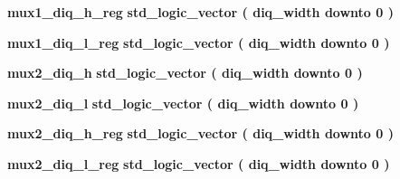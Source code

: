 \begin{DoxyCompactItemize}
\item 
{\bf mux1\+\_\+diq\+\_\+h\+\_\+reg} {\bfseries \textcolor{comment}{std\+\_\+logic\+\_\+vector}\textcolor{vhdlchar}{ }\textcolor{vhdlchar}{(}\textcolor{vhdlchar}{ }\textcolor{vhdlchar}{ }\textcolor{vhdlchar}{ }\textcolor{vhdlchar}{ }{\bfseries {\bf diq\+\_\+width}} \textcolor{vhdlchar}{ }\textcolor{keywordflow}{downto}\textcolor{vhdlchar}{ }\textcolor{vhdlchar}{ } \textcolor{vhdldigit}{0} \textcolor{vhdlchar}{ }\textcolor{vhdlchar}{)}\textcolor{vhdlchar}{ }} 
\item 
{\bf mux1\+\_\+diq\+\_\+l\+\_\+reg} {\bfseries \textcolor{comment}{std\+\_\+logic\+\_\+vector}\textcolor{vhdlchar}{ }\textcolor{vhdlchar}{(}\textcolor{vhdlchar}{ }\textcolor{vhdlchar}{ }\textcolor{vhdlchar}{ }\textcolor{vhdlchar}{ }{\bfseries {\bf diq\+\_\+width}} \textcolor{vhdlchar}{ }\textcolor{keywordflow}{downto}\textcolor{vhdlchar}{ }\textcolor{vhdlchar}{ } \textcolor{vhdldigit}{0} \textcolor{vhdlchar}{ }\textcolor{vhdlchar}{)}\textcolor{vhdlchar}{ }} 
\item 
{\bf mux2\+\_\+diq\+\_\+h} {\bfseries \textcolor{comment}{std\+\_\+logic\+\_\+vector}\textcolor{vhdlchar}{ }\textcolor{vhdlchar}{(}\textcolor{vhdlchar}{ }\textcolor{vhdlchar}{ }\textcolor{vhdlchar}{ }\textcolor{vhdlchar}{ }{\bfseries {\bf diq\+\_\+width}} \textcolor{vhdlchar}{ }\textcolor{keywordflow}{downto}\textcolor{vhdlchar}{ }\textcolor{vhdlchar}{ } \textcolor{vhdldigit}{0} \textcolor{vhdlchar}{ }\textcolor{vhdlchar}{)}\textcolor{vhdlchar}{ }} 
\item 
{\bf mux2\+\_\+diq\+\_\+l} {\bfseries \textcolor{comment}{std\+\_\+logic\+\_\+vector}\textcolor{vhdlchar}{ }\textcolor{vhdlchar}{(}\textcolor{vhdlchar}{ }\textcolor{vhdlchar}{ }\textcolor{vhdlchar}{ }\textcolor{vhdlchar}{ }{\bfseries {\bf diq\+\_\+width}} \textcolor{vhdlchar}{ }\textcolor{keywordflow}{downto}\textcolor{vhdlchar}{ }\textcolor{vhdlchar}{ } \textcolor{vhdldigit}{0} \textcolor{vhdlchar}{ }\textcolor{vhdlchar}{)}\textcolor{vhdlchar}{ }} 
\item 
{\bf mux2\+\_\+diq\+\_\+h\+\_\+reg} {\bfseries \textcolor{comment}{std\+\_\+logic\+\_\+vector}\textcolor{vhdlchar}{ }\textcolor{vhdlchar}{(}\textcolor{vhdlchar}{ }\textcolor{vhdlchar}{ }\textcolor{vhdlchar}{ }\textcolor{vhdlchar}{ }{\bfseries {\bf diq\+\_\+width}} \textcolor{vhdlchar}{ }\textcolor{keywordflow}{downto}\textcolor{vhdlchar}{ }\textcolor{vhdlchar}{ } \textcolor{vhdldigit}{0} \textcolor{vhdlchar}{ }\textcolor{vhdlchar}{)}\textcolor{vhdlchar}{ }} 
\item 
{\bf mux2\+\_\+diq\+\_\+l\+\_\+reg} {\bfseries \textcolor{comment}{std\+\_\+logic\+\_\+vector}\textcolor{vhdlchar}{ }\textcolor{vhdlchar}{(}\textcolor{vhdlchar}{ }\textcolor{vhdlchar}{ }\textcolor{vhdlchar}{ }\textcolor{vhdlchar}{ }{\bfseries {\bf diq\+\_\+width}} \textcolor{vhdlchar}{ }\textcolor{keywordflow}{downto}\textcolor{vhdlchar}{ }\textcolor{vhdlchar}{ } \textcolor{vhdldigit}{0} \textcolor{vhdlchar}{ }\textcolor{vhdlchar}{)}\textcolor{vhdlchar}{ }} 
\end{DoxyCompactItemize}
